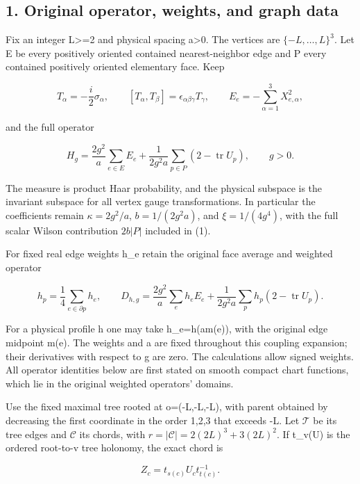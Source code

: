 \documentclass[
  11pt,
]{article}
\begin{document}
\subsection{1. Original operator, weights, and graph
data}\label{weak-coupling-part-14-original-operator-weights-and-graph-data}

Fix an integer L\textgreater=2 and physical spacing a\textgreater0. The
vertices are \(\{-L,\ldots,L\}^3\). Let E be every positively oriented
contained nearest-neighbor edge and P every contained positively
oriented elementary face. Keep

\[
 T_\alpha=-\frac i2\sigma_\alpha,\qquad
 [T_\alpha,T_\beta]=\epsilon_{\alpha\beta\gamma}T_\gamma,
 \qquad E_e=-\sum_{\alpha=1}^3X_{e,\alpha}^2,
\]

and the full operator

\[
 H_g=\frac{2g^2}{a}\sum_{e\in E}E_e
       +\frac1{2g^2a}\sum_{p\in P}(2-\operatorname{tr}U_p),
 \qquad g>0.                                                   \tag{1}
\]

The measure is product Haar probability, and the physical subspace is
the invariant subspace for all vertex gauge transformations. In
particular the coefficients remain \(\kappa=2g^2/a\), \(b=1/(2g^2a)\),
and \(\xi=1/(4g^4)\), with the full scalar Wilson contribution \(2b|P|\)
included in (1).

For fixed real edge weights h\_e retain the original face average and
weighted operator

\[
 h_p=\frac14\sum_{e\in\partial p}h_e,\qquad
 D_{h,g}=\frac{2g^2}{a}\sum_eh_eE_e
       +\frac1{2g^2a}\sum_ph_p(2-\operatorname{tr}U_p).          \tag{2}
\]

For a physical profile h one may take h\_e=h(am(e)), with the original
edge midpoint m(e). The weights and a are fixed throughout this coupling
expansion; their derivatives with respect to g are zero. The
calculations allow signed weights. All operator identities below are
first stated on smooth compact chart functions, which lie in the
original weighted operators' domains.

Use the fixed maximal tree rooted at o=(-L,-L,-L), with parent obtained
by decreasing the first coordinate in the order 1,2,3 that exceeds -L.
Let \(\mathcal T\) be its tree edges and \(\mathcal C\) its chords, with
\(r=|\mathcal C|=2(2L)^3+3(2L)^2\). If t\_v(U) is the ordered root-to-v
tree holonomy, the exact chord is

\[
 Z_c=t_{s(c)}U_ct_{t(c)}^{-1}.                              \tag{3}
\]
\end{document}
